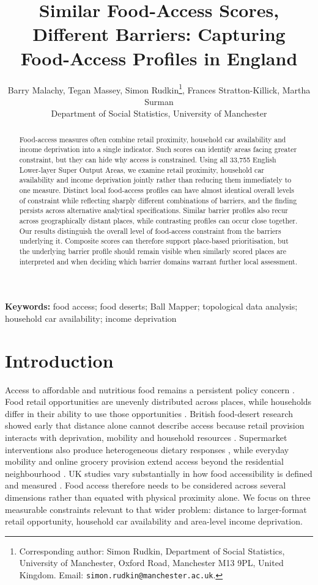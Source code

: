 \documentclass[11pt,a4paper]{article}
\title{Similar Food-Access Scores, Different Barriers: Capturing Food-Access Profiles in England}
\author{Barry Malachy, Tegan Massey, Simon Rudkin\thanks{Corresponding author: Simon Rudkin, Department of Social Statistics, University of Manchester, Oxford Road, Manchester M13 9PL, United Kingdom. Email: \texttt{simon.rudkin@manchester.ac.uk}.}, Frances Stratton-Killick, Martha Surman\\Department of Social Statistics, University of Manchester}
\date{}
\begin{document}
\maketitle

\begin{abstract}
Food-access measures often combine retail proximity, household car availability and income deprivation into a single indicator. Such scores can identify areas facing greater constraint, but they can hide why access is constrained. Using all 33,755 English Lower-layer Super Output Areas, we examine retail proximity, household car availability and income deprivation jointly rather than reducing them immediately to one measure. Distinct local food-access profiles can have almost identical overall levels of constraint while reflecting sharply different combinations of barriers, and the finding persists across alternative analytical specifications. Similar barrier profiles also recur across geographically distant places, while contrasting profiles can occur close together. Our results distinguish the overall level of food-access constraint from the barriers underlying it. Composite scores can therefore support place-based prioritisation, but the underlying barrier profile should remain visible when similarly scored places are interpreted and when deciding which barrier domains warrant further local assessment.
\end{abstract}

\noindent\textbf{Keywords:} food access; food deserts; Ball Mapper; topological data analysis; household car availability; income deprivation

\section{Introduction}
Access to affordable and nutritious food remains a persistent policy concern \citep{Wrigley2002,Whelan2002}. Food retail opportunities are unevenly distributed across places, while households differ in their ability to use those opportunities \citep{VerPloegWilde2018,Titis2022}. British food-desert research showed early that distance alone cannot describe access because retail provision interacts with deprivation, mobility and household resources \citep{Wrigley2002,Whelan2002,Wrigley2003}. Supermarket interventions also produce heterogeneous dietary responses \citep{GillRudkin2014,FreireRudkin2019}, while everyday mobility and online grocery provision extend access beyond the residential neighbourhood \citep{Shannon2016,Newing2022,Janatabadi2024}. UK studies vary substantially in how food accessibility is defined and measured \citep{Titis2022}. Food access therefore needs to be considered across several dimensions rather than equated with physical proximity alone. We focus on three measurable constraints relevant to that wider problem: distance to larger-format retail opportunity, household car availability and area-level income deprivation.
\end{document}
